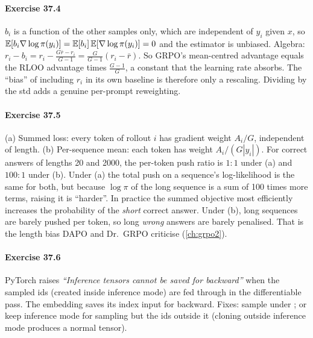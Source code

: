 \paragraph{Exercise 37.4} $b_i$ is a function of the other samples only, which are independent
of $y_i$ given $x$, so $\mathbb{E}[b_i\nabla\log\pi(y_i)]=\mathbb{E}[b_i]\,\mathbb{E}[\nabla\log\pi(y_i)]=0$ and the
estimator is unbiased. Algebra: $r_i-b_i=r_i-\frac{G\bar r-r_i}{G-1}=\frac{G}{G-1}(r_i-\bar r)$.
So GRPO's mean-centred advantage equals the RLOO advantage times $\frac{G-1}{G}$, a constant
that the learning rate absorbs. The ``bias'' of including $r_i$ in its own baseline is
therefore only a rescaling. Dividing by the std adds a genuine per-prompt reweighting.

\paragraph{Exercise 37.5} (a) Summed loss: every token of rollout $i$ has gradient weight
$A_i/G$, independent of length. (b) Per-sequence mean: each token has weight
$A_i/(G|y_i|)$. For correct answers of lengths 20 and 2000, the per-token push ratio is
$1:1$ under (a) and $100:1$ under (b). Under (a) the total push on a sequence's log-likelihood
is the same for both, but because $\log\pi$ of the long sequence is a sum of 100 times more
terms, raising it is ``harder''. In practice the summed objective most efficiently increases
the probability of the \emph{short} correct answer. Under (b), long sequences are barely
pushed per token, so long \emph{wrong} answers are barely penalised. That is the length bias
DAPO and Dr.~GRPO criticise (\cref{ch:grpo2}).

\paragraph{Exercise 37.6} PyTorch raises \emph{``Inference tensors cannot be saved for
backward''} when the sampled ids (created inside inference mode) are fed through
 in the differentiable pass. The embedding saves its index input for
backward. Fixes: sample under ; or keep inference mode for sampling but
 the ids outside it (cloning outside inference mode produces a normal tensor).

